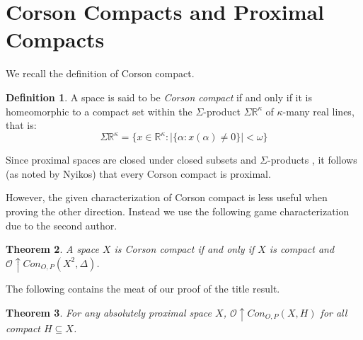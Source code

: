 \documentclass{amsart}
\newtheorem{thm}{Theorem}[section]
\theoremstyle{definition}
\newtheorem{defn}[thm]{Definition}
\theoremstyle{remark}
\newcommand{\<}{\langle}
\renewcommand{\>}{\rangle}
\newcommand{\congame}[2]{Con_{O,P}(#1,#2)}
\newcommand{\pl}[1]{\mathscr{#1}}
\newcommand{\win}{\uparrow}
\newcommand{\term}{\textit}
\begin{document}
\section{Corson Compacts and Proximal Compacts}

We recall  the definition of Corson compact.

\begin{defn}
  A space is said to be \term{Corson compact} if and only if it is homeomorphic to a compact set within the $\Sigma$-product $\Sigma\mathbb{R}^\kappa$ of $\kappa$-many real lines, that is:
    \[
      \Sigma\mathbb{R}^\kappa
        =
      \{x\in \mathbb{R}^\kappa: |\{\alpha:x(\alpha)\not=0\}|<\omega\}
    \]
\end{defn}


Since proximal spaces are closed under closed subsets and $\Sigma$-products \cite{b}, it follows (as noted by Nyikos) that every Corson compact is proximal.







However, the given characterization of Corson compact is less useful when proving the other direction.  Instead we use the following game characterization due to the second author.

\begin{thm}\cite{gcovering}
  A space $X$ is Corson compact if and only if $X$ is compact and $\pl O\win\congame{X^2}{\Delta}$.
\end{thm}


The following contains the meat of our proof of the title result.

\begin{thm}
  For any absolutely proximal space $X$, $\pl O\win \congame{X}{H}$ for all compact $H\subseteq X$.
\end{thm}
\end{document}

